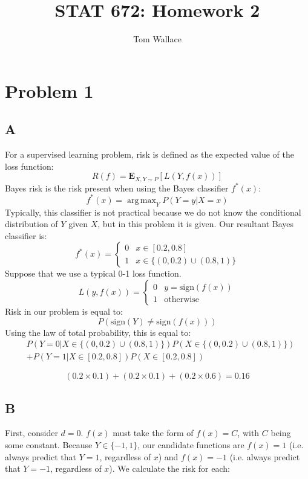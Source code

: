 \documentclass{report}
\title{STAT 672: Homework 2}
\author{Tom Wallace}
\DeclareMathOperator*{\argmax}{arg\,max}
\begin{document}
\maketitle

\section*{Problem 1}

\subsection*{A}

For a supervised learning problem, risk is defined as the expected value
of the loss function:
$$
R(f) = \mathbf{E}_{X, Y \sim P}[L(Y, f(x))]
$$
Bayes risk is the risk present when using the Bayes classifier $f^*(x)$:
$$f^*(x) = \argmax_Y P(Y=y|X=x)$$
Typically, this classifier is not practical because we do not know the
conditional distribution of $Y$ given $X$, but in this problem it is given.
Our resultant Bayes classifier is:
$$
f^*(x) = 
\begin{cases}
	0 & x \in [0.2, 0.8] \\
	1 & x \in \{(0, 0.2) \cup (0.8, 1)\} 
\end{cases}
$$
Suppose that we use a typical 0-1 loss function.  
$$
L(y, f(x)) = 
\begin{cases} 
	0 & y = \mathrm{sign}(f(x)) \\ 
	1 & \mathrm{otherwise}
\end{cases}
$$
Risk in our problem is equal to:
$$
P(\mathrm{sign}(Y) \neq \mathrm{sign}(f(x)))
$$
Using the law of total probability, this is equal to:
\begin{equation}
	\begin{split}
		& P(Y=0|X \in \{(0, 0.2) \cup (0.8, 1)\})P(X \in \{(0, 0.2) \cup (0.8,
		1)\}) \\
		& + P(Y=1|X \in [0.2, 0.8])P(X \in [0.2, 0.8]) 
	\end{split}
\end{equation}

$$
(0.2 \times 0.1) + (0.2 \times 0.1) + (0.2 \times 0.6) = 0.16
$$

\subsection*{B}
First, consider $d=0$. $f(x)$ must take the form of $f(x) =
C$, with $C$ being some constant. Because $Y \in \{-1, 1\}$, our candidate functions are $f(x)
= 1$ (i.e. always predict that $Y=1$, regardless of $x$) and $f(x) = -1$ (i.e.
always predict that $Y=-1$, regardless of $x$). We calculate the risk for each:
\end{document}
